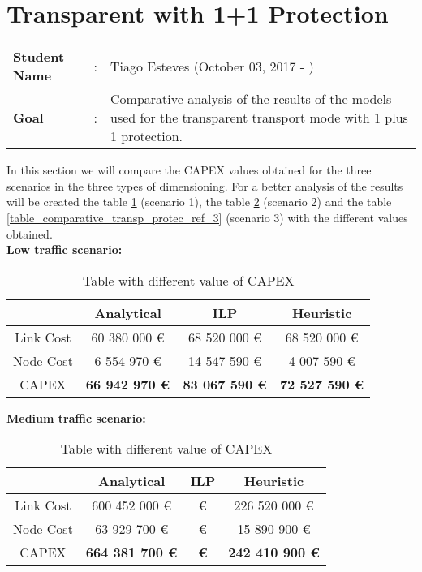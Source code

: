 \clearpage

\section{Transparent with 1+1 Protection}\label{comparative_Transp_Protection}
\begin{tcolorbox}	
\begin{tabular}{p{2.75cm} p{0.2cm} p{10.5cm}} 	
\textbf{Student Name}  &:& Tiago Esteves    (October 03, 2017 - )\\
\textbf{Goal}          &:& Comparative analysis of the results of the models used for the transparent transport mode with 1 plus 1 protection.
\end{tabular}
\end{tcolorbox}
\vspace{11pt}


In this section we will compare the CAPEX values obtained for the three scenarios in the three types of dimensioning. For a better analysis of the results will be created the table \ref{table_comparative_transp_protec_ref_1} (scenario 1), the table \ref{table_comparative_transp_protec_ref_2} (scenario 2) and the table \ref{table_comparative_transp_protec_ref_3} (scenario 3) with the different values obtained.\\

\textbf{Low traffic scenario:}

\begin{table}[h!]
\centering
\begin{tabular}{| c | c | c | c |}
 \hline
   & Analytical & ILP & Heuristic \\
 \hline\hline
 Link Cost & 60 380 000 \euro & 68 520 000 \euro & 68 520 000 \euro \\
 Node Cost & 6 554 970 \euro & 14 547 590 \euro & 4 007 590 \euro \\
 CAPEX & \textbf{66 942 970 \euro} & \textbf{83 067 590 \euro} & \textbf{72 527 590 \euro} \\
 \hline
\end{tabular}
\caption{Table with different value of CAPEX }
\label{table_comparative_transp_protec_ref_1}
\end{table}


\vspace{11pt}
\textbf{Medium traffic scenario:}

\begin{table}[h!]
\centering
\begin{tabular}{| c | c | c | c |}
 \hline
   & Analytical & ILP & Heuristic \\
 \hline\hline
 Link Cost & 600 452 000 \euro &  \euro & 226 520 000 \euro \\
 Node Cost & 63 929 700 \euro &  \euro & 15 890 900 \euro \\
 CAPEX & \textbf{664 381 700 \euro} & \textbf{ \euro} & \textbf{242 410 900 \euro} \\
 \hline
\end{tabular}
\caption{Table with different value of CAPEX }
\label{table_comparative_transp_protec_ref_2}
\end{table}


